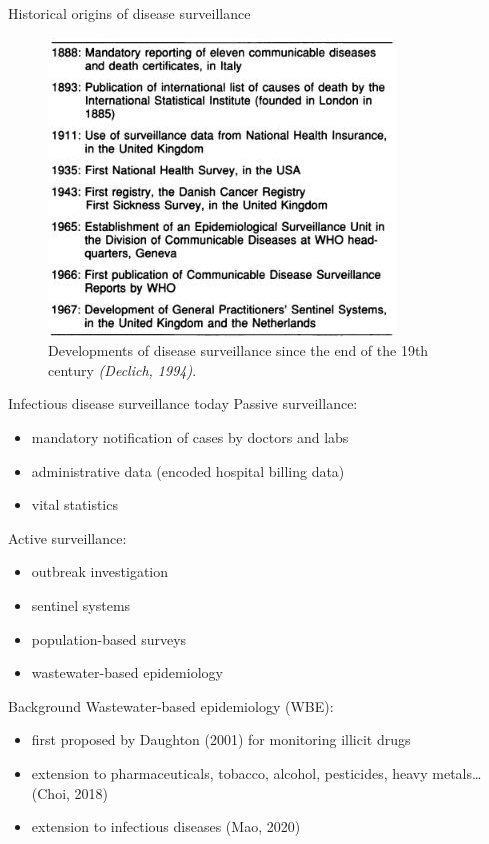 \documentclass[
  ignorenonframetext,
]{beamer}
\begin{document}
\begin{frame}{Historical origins of disease surveillance}
\protect\hypertarget{historical-origins-of-disease-surveillance-2}{}
\begin{figure}
\centering
\includegraphics[width=.5\linewidth]{figures/declich_developments_20th_Century.jpg}
\caption{Developments of disease surveillance since the end of the 19th century \textit{(Declich, 1994)}.}
\end{figure}
\end{frame}

\begin{frame}{Infectious disease surveillance today}
\protect\hypertarget{infectious-disease-surveillance-today}{}
Passive surveillance:

\begin{itemize}
\item
  \alert{mandatory notification} of cases by doctors and labs
\item
  administrative data (encoded hospital billing data)
\item
  vital statistics \pause\bigskip
\end{itemize}

Active surveillance:

\begin{itemize}
\item
  outbreak investigation
\item
  sentinel systems
\item
  population-based surveys
\item
  \alert{wastewater-based epidemiology}
\end{itemize}
\end{frame}

\begin{frame}{Background}
\protect\hypertarget{background}{}
Wastewater-based epidemiology (WBE):

\begin{itemize}
\item
  first proposed by Daughton (2001) for monitoring \alert{illicit drugs}
\item
  extension to pharmaceuticals, tobacco, alcohol, pesticides, heavy
  metals\ldots{} (Choi, 2018)
\item
  extension to \alert{infectious diseases} (Mao, 2020)
\end{itemize}
\end{frame}
\end{document}
